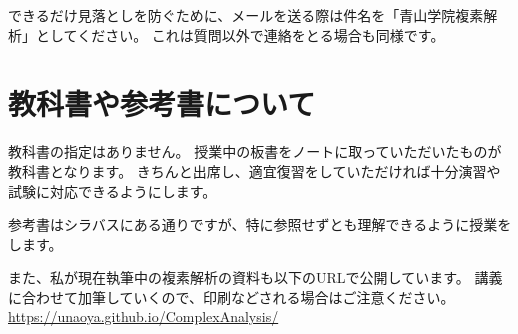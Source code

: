 \documentclass{ltjsarticle}
\begin{document}
できるだけ見落としを防ぐために、メールを送る際は件名を「青山学院複素解析」としてください。
これは質問以外で連絡をとる場合も同様です。

\section*{教科書や参考書について}

教科書の指定はありません。
授業中の板書をノートに取っていただいたものが教科書となります。
きちんと出席し、適宜復習をしていただければ十分演習や試験に対応できるようにします。

参考書はシラバスにある通りですが、特に参照せずとも理解できるように授業をします。

また、私が現在執筆中の複素解析の資料も以下のURLで公開しています。
講義に合わせて加筆していくので、印刷などされる場合はご注意ください。
\url{https://unaoya.github.io/ComplexAnalysis/}
\end{document}
